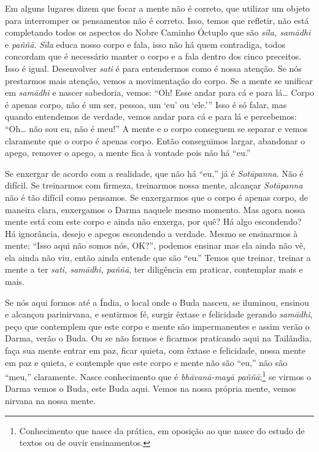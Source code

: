 Em alguns lugares dizem que focar a mente não é correto, que
utilizar um objeto para interromper os pensamentos não é correto. Isso,
temos que refletir, não está completando todos os aspectos do Nobre
Caminho Óctuplo que são \textit{sīla, samādhi} e\textit{ paññā}.
\textit{Sīla} educa nosso corpo e fala, isso não há quem contradiga,
todos concordam que é necessário manter o corpo e a fala dentro dos
cinco preceitos. Isso é igual. Desenvolver \textit{sati} é para
entendermos como é nossa atenção. Se nós prestarmos mais atenção, vemos
a movimentação do corpo. Se a mente se unificar em \textit{samādhi} e
nascer sabedoria, vemos: “Oh! Esse andar para cá e para lá… Corpo é
apenas corpo, não é um ser, pessoa, um ‘eu’ ou ‘ele.’” Isso é só falar,
mas quando entendemos de verdade, vemos andar para cá e para lá e
percebemos: “Oh… não sou eu, não é meu!” A mente e o corpo conseguem se
separar e vemos claramente que o corpo é apenas corpo. Então
conseguimos largar, abandonar o apego, remover o apego, a mente fica à
vontade pois não há “eu.” 

Se enxergar de acordo com a realidade, que não há “eu,” já é
\textit{Sotāpanna}. Não é difícil. Se treinarmos com firmeza,
treinarmos nossa mente, alcançar \textit{Sotāpanna} não é tão difícil
como pensamos. Se enxergarmos que o corpo é apenas corpo, de maneira
clara, enxergamos o Darma naquele mesmo momento. Mas agora nossa mente
está com este corpo e ainda não enxerga, por quê? Há algo escondendo?
Há ignorância, desejo e apegos escondendo a verdade. Mesmo se
ensinarmos à mente: “Isso aqui não somos nós, OK?”, podemos ensinar mas
ela ainda não vê, ela ainda não viu, então ainda entende que são “eu.”
Temos que treinar, treinar a mente a ter \textit{sati, samādhi,
paññā}, ter diligência em praticar, contemplar mais e mais. 

Se nós aqui formos até a Índia, o local onde o Buda nasceu, se
iluminou, ensinou e alcançou parinirvana, e sentirmos fé, surgir êxtase
e felicidade gerando \textit{samādhi}, peço que contemplem que este
corpo e mente são impermanentes e assim verão o Darma, verão o Buda. Ou
se não formos e ficarmos praticando aqui na Tailândia, faça sua mente
entrar em paz, ficar quieta, com êxtase e felicidade, nossa mente em
paz e quieta, e contemple que este corpo e mente não são “eu,” não são
“meu,” claramente. Nasce conhecimento que é \textit{bhāvanā-mayā
paññā};\footnote{Conhecimento que nasce da prática, em oposição ao que
nasce do estudo de textos ou de ouvir ensinamentos.} se virmos o Darma
vemos o Buda, este Buda aqui. Vemos na nossa própria mente, vemos
nirvana na nossa mente. 

